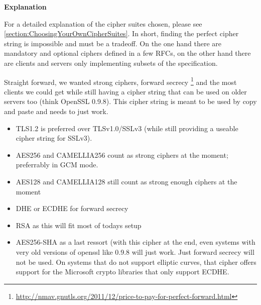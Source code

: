 \textbf{Explanation}

For a detailed explanation of the cipher suites chosen, please see
\ref{section:ChoosingYourOwnCipherSuites}. In short, finding the perfect cipher
string is impossible and must be a tradeoff. On the one hand
there are mandatory and optional ciphers defined in a few RFCs, on the other hand
there are clients and servers only implementing subsets of the specification.

Straight forward, we wanted strong ciphers, forward secrecy
\footnote{\url{http://nmav.gnutls.org/2011/12/price-to-pay-for-perfect-forward.html}}
and the most clients we could get while still having a cipher string that can be
used on older servers too (think OpenSSL 0.9.8). This cipher string is meant to be used
by copy and paste and needs to just work.

\begin{itemize}
\item TLS1.2 is preferred over TLSv1.0/SSLv3 (while still providing a useable cipher
      string for SSLv3).
\item AES256 and CAMELLIA256 count as strong ciphers at the moment; preferrably in
      GCM mode.\\
\item AES128 and CAMELLIA128 still count as strong enough ciphers at the moment
\item DHE or ECDHE for forward secrecy
\item RSA as this will fit most of todays setup
\item AES256-SHA as a last ressort (with this cipher at the end, even systems with
      very old versions of openssl like 0.9.8 will just work. Just forward secrecy
      will not be used. On systems that do not support elliptic curves, that cipher
      offers support for the Microsoft crypto libraries that only support ECDHE.
\end{itemize}

